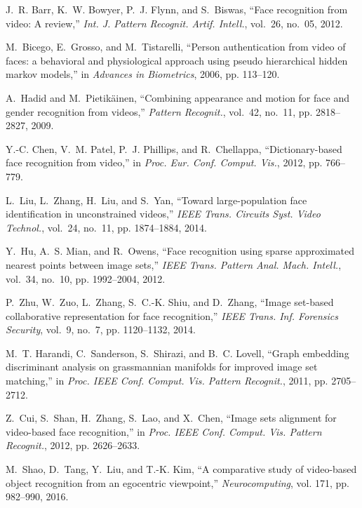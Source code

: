 \documentclass[10pt,journal,cspaper,compsoc]{IEEEtran}
\begin{document}
\begin{thebibliography}{10}
J.~R. Barr, K.~W. Bowyer, P.~J. Flynn, and S.~Biswas, ``Face recognition from
  video: A review,'' \emph{Int. J. Pattern Recognit. Artif. Intell.}, vol.~26,
  no.~05, 2012.

M.~Bicego, E.~Grosso, and M.~Tistarelli, ``Person authentication from video of
  faces: a behavioral and physiological approach using pseudo hierarchical
  hidden markov models,'' in \emph{Advances in Biometrics}, 2006, pp. 113--120.

A.~Hadid and M.~Pietik{\"a}inen, ``Combining appearance and motion for face and
  gender recognition from videos,'' \emph{Pattern Recognit.}, vol.~42, no.~11,
  pp. 2818--2827, 2009.

Y.-C. Chen, V.~M. Patel, P.~J. Phillips, and R.~Chellappa, ``Dictionary-based
  face recognition from video,'' in \emph{Proc. Eur. Conf. Comput. Vis.}, 2012,
  pp. 766--779.

L.~Liu, L.~Zhang, H.~Liu, and S.~Yan, ``Toward large-population face
  identification in unconstrained videos,'' \emph{IEEE Trans. Circuits Syst.
  Video Technol.}, vol.~24, no.~11, pp. 1874--1884, 2014.

Y.~Hu, A.~S. Mian, and R.~Owens, ``Face recognition using sparse approximated
  nearest points between image sets,'' \emph{IEEE Trans. Pattern Anal. Mach.
  Intell.}, vol.~34, no.~10, pp. 1992--2004, 2012.

P.~Zhu, W.~Zuo, L.~Zhang, S.~C.-K. Shiu, and D.~Zhang, ``Image set-based
  collaborative representation for face recognition,'' \emph{IEEE Trans. Inf.
  Forensics Security}, vol.~9, no.~7, pp. 1120--1132, 2014.

M.~T. Harandi, C.~Sanderson, S.~Shirazi, and B.~C. Lovell, ``Graph embedding
  discriminant analysis on grassmannian manifolds for improved image set
  matching,'' in \emph{Proc. IEEE Conf. Comput. Vis. Pattern Recognit.}, 2011,
  pp. 2705--2712.

Z.~Cui, S.~Shan, H.~Zhang, S.~Lao, and X.~Chen, ``Image sets alignment for
  video-based face recognition,'' in \emph{Proc. IEEE Conf. Comput. Vis.
  Pattern Recognit.}, 2012, pp. 2626--2633.

M.~Shao, D.~Tang, Y.~Liu, and T.-K. Kim, ``A comparative study of video-based
  object recognition from an egocentric viewpoint,'' \emph{Neurocomputing},
  vol. 171, pp. 982--990, 2016.


\end{thebibliography}
\end{document}
